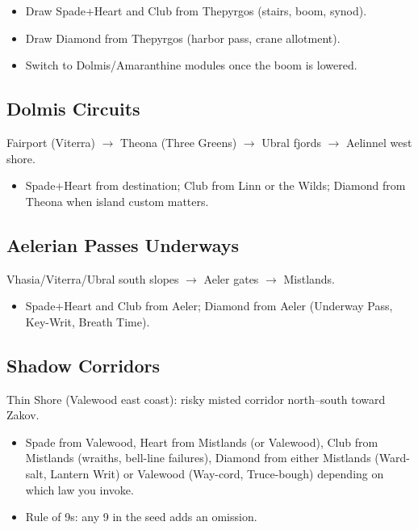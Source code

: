 \begin{itemize}
\item Draw Spade+Heart and Club from Thepyrgos (stairs, boom, synod).
\item Draw Diamond from Thepyrgos (harbor pass, crane allotment).
\item Switch to Dolmis/Amaranthine modules once the boom is lowered.
\end{itemize}

\subsection{Dolmis Circuits}
Fairport (Viterra) $\rightarrow$ Theona (Three Greens) $\rightarrow$ Ubral fjords $\rightarrow$ Aelinnel west shore.

\begin{itemize}
\item Spade+Heart from destination; Club from Linn or the Wilds; Diamond from Theona when island custom matters.
\end{itemize}

\subsection{Aelerian Passes Underways}
Vhasia/Viterra/Ubral south slopes $\rightarrow$ Aeler gates $\rightarrow$ Mistlands.

\begin{itemize}
\item Spade+Heart and Club from Aeler; Diamond from Aeler (Underway Pass, Key-Writ, Breath Time).
\end{itemize}

\subsection{Shadow Corridors}
Thin Shore (Valewood east coast): risky misted corridor north--south toward Zakov.

\begin{itemize}
\item Spade from Valewood, Heart from Mistlands (or Valewood), Club from Mistlands (wraiths, bell-line failures), Diamond from either Mistlands (Ward-salt, Lantern Writ) or Valewood (Way-cord, Truce-bough) depending on which law you invoke.
\item Rule of 9s: any 9 in the seed adds an omission.
\end{itemize}

